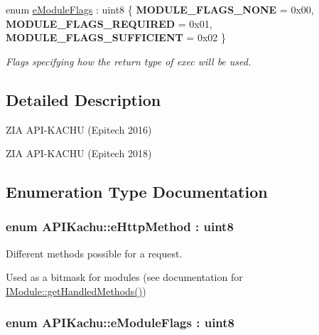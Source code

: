 \begin{DoxyCompactItemize}
\item 
enum \hyperlink{namespace_a_p_i_kachu_a89a2d383090085f6b3dbda8547b6b014}{e\+Module\+Flags} \+: uint8 \{ {\bfseries M\+O\+D\+U\+L\+E\+\_\+\+F\+L\+A\+G\+S\+\_\+\+N\+O\+NE} = 0x00, 
{\bfseries M\+O\+D\+U\+L\+E\+\_\+\+F\+L\+A\+G\+S\+\_\+\+R\+E\+Q\+U\+I\+R\+ED} = 0x01, 
{\bfseries M\+O\+D\+U\+L\+E\+\_\+\+F\+L\+A\+G\+S\+\_\+\+S\+U\+F\+F\+I\+C\+I\+E\+NT} = 0x02
 \}\begin{DoxyCompactList}\small\item\em Flags specifying how the return type of exec will be used. \end{DoxyCompactList}
\end{DoxyCompactItemize}


\subsection{Detailed Description}
Z\+IA A\+P\+I-\/\+K\+A\+C\+HU (Epitech 2016)

Z\+IA A\+P\+I-\/\+K\+A\+C\+HU (Epitech 2018) 

\subsection{Enumeration Type Documentation}
\subsubsection[{\texorpdfstring{e\+Http\+Method}{eHttpMethod}}]{\setlength{\rightskip}{0pt plus 5cm}enum {\bf A\+P\+I\+Kachu\+::e\+Http\+Method} \+: uint8}\hypertarget{namespace_a_p_i_kachu_aeff09045bb4c289dc6f23d46950d830e}{}\label{namespace_a_p_i_kachu_aeff09045bb4c289dc6f23d46950d830e}


Different methods possible for a request. 

Used as a bitmask for modules (see documentation for \hyperlink{class_a_p_i_kachu_1_1_i_module_aaad7d8817c8b1344fbe310d7e5e85404}{I\+Module\+::get\+Handled\+Methods()}) 
\subsubsection[{\texorpdfstring{e\+Module\+Flags}{eModuleFlags}}]{\setlength{\rightskip}{0pt plus 5cm}enum {\bf A\+P\+I\+Kachu\+::e\+Module\+Flags} \+: uint8}\hypertarget{namespace_a_p_i_kachu_a89a2d383090085f6b3dbda8547b6b014}{}\label{namespace_a_p_i_kachu_a89a2d383090085f6b3dbda8547b6b014}


